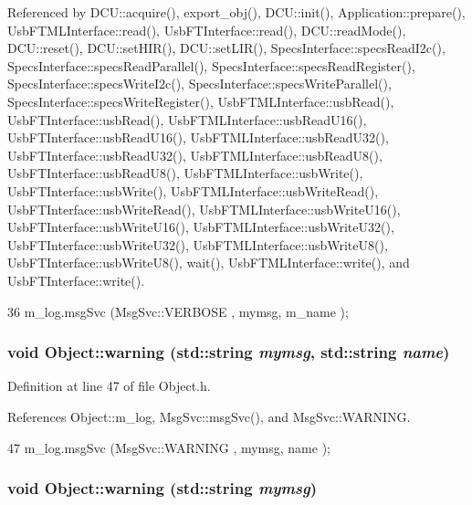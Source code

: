 Referenced by DCU::acquire(), export\_\-obj(), DCU::init(), Application::prepare(), UsbFTMLInterface::read(), UsbFTInterface::read(), DCU::readMode(), DCU::reset(), DCU::setHIR(), DCU::setLIR(), SpecsInterface::specsReadI2c(), SpecsInterface::specsReadParallel(), SpecsInterface::specsReadRegister(), SpecsInterface::specsWriteI2c(), SpecsInterface::specsWriteParallel(), SpecsInterface::specsWriteRegister(), UsbFTMLInterface::usbRead(), UsbFTInterface::usbRead(), UsbFTMLInterface::usbReadU16(), UsbFTInterface::usbReadU16(), UsbFTMLInterface::usbReadU32(), UsbFTInterface::usbReadU32(), UsbFTMLInterface::usbReadU8(), UsbFTInterface::usbReadU8(), UsbFTMLInterface::usbWrite(), UsbFTInterface::usbWrite(), UsbFTMLInterface::usbWriteRead(), UsbFTInterface::usbWriteRead(), UsbFTMLInterface::usbWriteU16(), UsbFTInterface::usbWriteU16(), UsbFTMLInterface::usbWriteU32(), UsbFTInterface::usbWriteU32(), UsbFTMLInterface::usbWriteU8(), UsbFTInterface::usbWriteU8(), wait(), UsbFTMLInterface::write(), and UsbFTInterface::write().


\begin{DoxyCode}
36 { m_log.msgSvc (MsgSvc::VERBOSE , mymsg, m_name ); }
\end{DoxyCode}
\hypertarget{classObject_a11f101db4dd73d9391b0231818881d86}{
\subsubsection[{warning}]{\setlength{\rightskip}{0pt plus 5cm}void Object::warning (std::string {\em mymsg}, \/  std::string {\em name})}}
\label{classObject_a11f101db4dd73d9391b0231818881d86}


Definition at line 47 of file Object.h.

References Object::m\_\-log, MsgSvc::msgSvc(), and MsgSvc::WARNING.


\begin{DoxyCode}
47 { m_log.msgSvc (MsgSvc::WARNING , mymsg, name ); }
\end{DoxyCode}
\hypertarget{classObject_a65cd4fda577711660821fd2cd5a3b4c9}{
\subsubsection[{warning}]{\setlength{\rightskip}{0pt plus 5cm}void Object::warning (std::string {\em mymsg})}}
\label{classObject_a65cd4fda577711660821fd2cd5a3b4c9}


